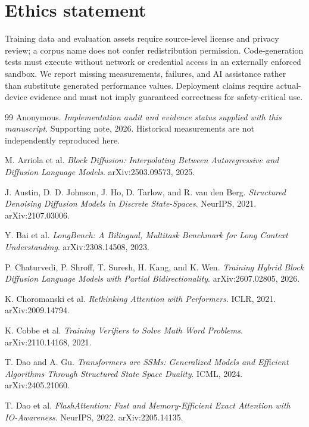 \documentclass{article}
\theoremstyle{remark}\newtheorem{remark}[theorem]{Remark}
\begin{document}
\section*{Ethics statement}
Training data and evaluation assets require source-level license and privacy review; a corpus name does not confer redistribution permission. Code-generation tests must execute without network or credential access in an externally enforced sandbox. We report missing measurements, failures, and AI assistance rather than substitute generated performance values. Deployment claims require actual-device evidence and must not imply guaranteed correctness for safety-critical use.

\clearpage
\begin{thebibliography}{99}
 Anonymous. \emph{Implementation audit and evidence status supplied with this manuscript}. Supporting note, 2026. Historical measurements are not independently reproduced here.

 M. Arriola et al. \emph{Block Diffusion: Interpolating Between Autoregressive and Diffusion Language Models}. arXiv:2503.09573, 2025.

 J. Austin, D. D. Johnson, J. Ho, D. Tarlow, and R. van den Berg. \emph{Structured Denoising Diffusion Models in Discrete State-Spaces}. NeurIPS, 2021. arXiv:2107.03006.

 Y. Bai et al. \emph{LongBench: A Bilingual, Multitask Benchmark for Long Context Understanding}. arXiv:2308.14508, 2023.

 P. Chaturvedi, P. Shroff, T. Suresh, H. Kang, and K. Wen. \emph{Training Hybrid Block Diffusion Language Models with Partial Bidirectionality}. arXiv:2607.02805, 2026.

 K. Choromanski et al. \emph{Rethinking Attention with Performers}. ICLR, 2021. arXiv:2009.14794.

 K. Cobbe et al. \emph{Training Verifiers to Solve Math Word Problems}. arXiv:2110.14168, 2021.

 T. Dao and A. Gu. \emph{Transformers are SSMs: Generalized Models and Efficient Algorithms Through Structured State Space Duality}. ICML, 2024. arXiv:2405.21060.

 T. Dao et al. \emph{FlashAttention: Fast and Memory-Efficient Exact Attention with IO-Awareness}. NeurIPS, 2022. arXiv:2205.14135.


\end{thebibliography}
\end{document}
